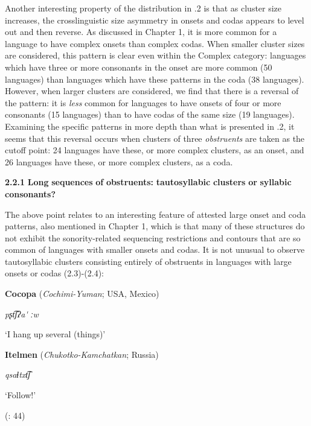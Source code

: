   Another interesting property of the distribution in .2 is that as cluster size increases, the crosslinguistic size asymmetry in onsets and codas appears to level out and then reverse. As discussed in Chapter 1, it is more common for a language to have complex onsets than complex codas. When smaller cluster sizes are considered, this pattern is clear even within the Complex category: languages which have three or more consonants in the onset are more common (50 languages) than languages which have these patterns in the coda (38 languages). However, when larger clusters are considered, we find that there is a reversal of the pattern: it is \textit{less} common for languages to have onsets of four or more consonants (15 languages) than to have codas of the same size (19 languages). Examining the specific patterns in more depth than what is presented in .2, it seems that this reversal occurs when clusters of three \textit{obstruents} are taken as the cutoff point: 24 languages have these, or more complex clusters, as an onset, and 26 languages have these, or more complex clusters, as a coda.

\textbf{2.2.1} \textbf{Long} \textbf{sequences} \textbf{of} \textbf{obstruents:} \textbf{tautosyllabic} \textbf{clusters} \textbf{or} \textbf{syllabic} \textbf{consonants?}

  The above point relates to an interesting feature of attested large onset and coda patterns, also mentioned in Chapter 1, which is that many of these structures do not exhibit the sonority-related sequencing restrictions and contours that are so common of languages with smaller onsets and codas. It is not unusual to observe tautosyllabic clusters consisting entirely of obstruents in languages with large onsets or codas (2.3)-(2.4):

\ea\label{ex:(2.3)}
   \textbf{Cocopa} (\textit{Cochimi-Yuman}; USA, Mexico)

  \textit{pʂt͡ʃʔa\'{} ːw}

  ‘I hang up several (things)’

  \citep[36]{Crawford1966}

\z

\ea\label{ex:(2.4)}
   \textbf{Itelmen} (\textit{Chukotko-Kamchatkan}; Russia)

  \textit{qsaɬtxt͡ʃ}

  ‘Follow!’

  (\citealt{GeorgVolodin1999}: 44)

\z

